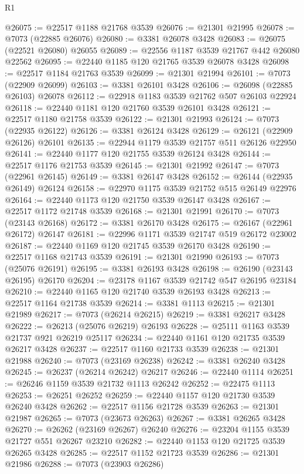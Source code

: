 \begin{lexlean}{R1}
\begin{coremodule}
@26075 := @22517 @1188 @21768 @3539
@26076 := @21301 @21995
@26078 := @7073 (@22885 @26076)
@26080 := @3381 @26078 @3428
@26083 := @26075 (@22521 @26080) @26055
@26089 := @22556 @1187 @3539 @21767 @442 @26080 @22562
@26095 := @22440 @1185 @120 @21765 @3539 @26078 @3428
@26098 := @22517 @1184 @21763 @3539
@26099 := @21301 @21994
@26101 := @7073 (@22909 @26099)
@26103 := @3381 @26101 @3428
@26106 := @26098 (@22885 @26103) @26078
@26112 := @22918 @1183 @3539 @21762 @507 @26103 @22924
@26118 := @22440 @1181 @120 @21760 @3539 @26101 @3428
@26121 := @22517 @1180 @21758 @3539
@26122 := @21301 @21993
@26124 := @7073 (@22935 @26122)
@26126 := @3381 @26124 @3428
@26129 := @26121 (@22909 @26126) @26101
@26135 := @22944 @1179 @3539 @21757 @511 @26126 @22950
@26141 := @22440 @1177 @120 @21755 @3539 @26124 @3428
@26144 := @22517 @1176 @21753 @3539
@26145 := @21301 @21992
@26147 := @7073 (@22961 @26145)
@26149 := @3381 @26147 @3428
@26152 := @26144 (@22935 @26149) @26124
@26158 := @22970 @1175 @3539 @21752 @515 @26149 @22976
@26164 := @22440 @1173 @120 @21750 @3539 @26147 @3428
@26167 := @22517 @1172 @21748 @3539
@26168 := @21301 @21991
@26170 := @7073 (@23143 @26168)
@26172 := @3381 @26170 @3428
@26175 := @26167 (@22961 @26172) @26147
@26181 := @22996 @1171 @3539 @21747 @519 @26172 @23002
@26187 := @22440 @1169 @120 @21745 @3539 @26170 @3428
@26190 := @22517 @1168 @21743 @3539
@26191 := @21301 @21990
@26193 := @7073 (@25076 @26191)
@26195 := @3381 @26193 @3428
@26198 := @26190 (@23143 @26195) @26170
@26204 := @23178 @1167 @3539 @21742 @547 @26195 @23184
@26210 := @22440 @1165 @120 @21740 @3539 @26193 @3428
@26213 := @22517 @1164 @21738 @3539
@26214 := @3381 @1113
@26215 := @21301 @21989
@26217 := @7073 (@26214 @26215)
@26219 := @3381 @26217 @3428
@26222 := @26213 (@25076 @26219) @26193
@26228 := @25111 @1163 @3539 @21737 @921 @26219 @25117
@26234 := @22440 @1161 @120 @21735 @3539 @26217 @3428
@26237 := @22517 @1160 @21733 @3539
@26238 := @21301 @21988
@26240 := @7073 (@23169 @26238)
@26242 := @3381 @26240 @3428
@26245 := @26237 (@26214 @26242) @26217
@26246 := @22440 @1114
@26251 := @26246 @1159 @3539 @21732 @1113 @26242
@26252 := @22475 @1113
@26253 := @26251 @26252
@26259 := @22440 @1157 @120 @21730 @3539 @26240 @3428
@26262 := @22517 @1156 @21728 @3539
@26263 := @21301 @21987
@26265 := @7073 (@23673 @26263)
@26267 := @3381 @26265 @3428
@26270 := @26262 (@23169 @26267) @26240
@26276 := @23204 @1155 @3539 @21727 @551 @26267 @23210
@26282 := @22440 @1153 @120 @21725 @3539 @26265 @3428
@26285 := @22517 @1152 @21723 @3539
@26286 := @21301 @21986
@26288 := @7073 (@23903 @26286)

\end{coremodule}
\end{lexlean}
